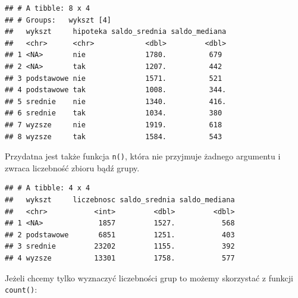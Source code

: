 \documentclass[]{book}
\newenvironment{Shaded}{\begin{snugshade}}{\end{snugshade}}
\newcommand{\KeywordTok}[1]{\textcolor[rgb]{0.13,0.29,0.53}{\textbf{#1}}}
\newcommand{\DataTypeTok}[1]{\textcolor[rgb]{0.13,0.29,0.53}{#1}}
\newcommand{\StringTok}[1]{\textcolor[rgb]{0.31,0.60,0.02}{#1}}
\newcommand{\OperatorTok}[1]{\textcolor[rgb]{0.81,0.36,0.00}{\textbf{#1}}}
\newcommand{\NormalTok}[1]{#1}
\begin{document}
\begin{verbatim}
## # A tibble: 8 x 4
## # Groups:   wykszt [4]
##   wykszt     hipoteka saldo_srednia saldo_mediana
##   <chr>      <chr>            <dbl>         <dbl>
## 1 <NA>       nie              1780.          679 
## 2 <NA>       tak              1207.          442 
## 3 podstawowe nie              1571.          521 
## 4 podstawowe tak              1008.          344.
## 5 srednie    nie              1340.          416.
## 6 srednie    tak              1034.          380 
## 7 wyzsze     nie              1919.          618 
## 8 wyzsze     tak              1584.          543
\end{verbatim}

Przydatna jest także funkcja \texttt{n()}, która nie przyjmuje żadnego
argumentu i zwraca liczebność zbioru bądź grupy.

\begin{Shaded}
\end{Shaded}

\begin{verbatim}
## # A tibble: 4 x 4
##   wykszt     liczebnosc saldo_srednia saldo_mediana
##   <chr>           <int>         <dbl>         <dbl>
## 1 <NA>             1857         1527.           568
## 2 podstawowe       6851         1251.           403
## 3 srednie         23202         1155.           392
## 4 wyzsze          13301         1758.           577
\end{verbatim}

Jeżeli chcemy tylko wyznaczyć liczebności grup to możemy skorzystać z
funkcji \texttt{count()}:

\begin{Shaded}
\end{Shaded}
\end{document}

